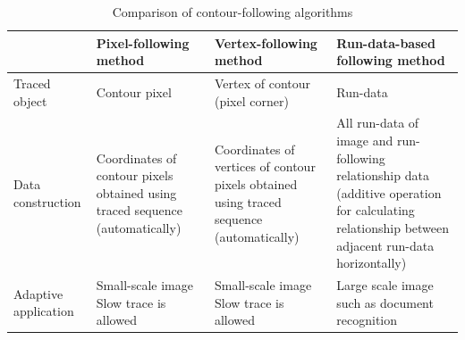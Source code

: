 \begin{table}[h]
	\begin{tabular}{L{3cm}L{4.5cm}L{4.5cm}L{4.5cm}}
		\hline
		& Pixel-following method & Vertex-following method & Run-data-based following method \\
		\hline
		Traced object 		& Contour pixel & Vertex of contour (pixel corner) & Run-data \\
		Data construction  	& Coordinates of contour pixels obtained using traced sequence (automatically)
 & Coordinates of vertices of contour pixels obtained using traced sequence (automatically)
 & All run-data of image and run-following relationship data 
(additive operation for calculating relationship between adjacent run-data horizontally) \\
		Adaptive application \cite{Miyatake1997Contour}	& Small-scale image \newline Slow trace is allowed
	& Small-scale image \newline Slow trace is allowed	& Large scale image such as document recognition \\
		\hline
	\end{tabular}
	\caption{Comparison of contour-following algorithms}
	\label{table:relatedworks}
\end{table}


